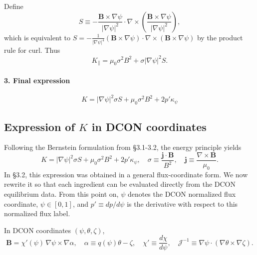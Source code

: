 \documentclass[10pt,a4paper]{article}
\numberwithin{equation}{section}
\begin{document}
Define
\begin{equation}
S \equiv -\frac{\mathbf B\times\nabla\psi}{|\nabla\psi|^2}\cdot\nabla\times\left(\frac{\mathbf B\times\nabla\psi}{|\nabla\psi|^2}\right),
\end{equation}
which is equivalent to $S = -\frac{1}{|\nabla\psi|^4}(\mathbf B\times\nabla\psi)\cdot\nabla\times(\mathbf B\times\nabla\psi)$ by the product rule for curl.
Thus
\begin{equation}
\boxed{K_{\parallel} = \mu_0\sigma^2B^2 + \sigma|\nabla\psi|^2 S}.
\end{equation}

\paragraph{3. Final expression}
\begin{equation}
\boxed{
K = |\nabla\psi|^2 \sigma S + \mu_0\sigma^2B^2 + 2p'\kappa_\psi
}
\end{equation}

\subsection{Expression of $K$ in DCON coordinates}

Following the Bernstein formulation from §3.1-3.2, the energy principle yields
\color{blue}
\begin{equation}
K = |\nabla\psi|^2 \sigma S + \mu_0 \sigma^2 B^2 + 2p'\kappa_\psi, \quad
\sigma \equiv \frac{\mathbf j\cdot\mathbf B}{B^2}, \quad
\mathbf j \equiv \frac{\nabla\times\mathbf B}{\mu_0}.
\end{equation}
\color{black}
In §3.2, this expression was obtained in a general flux-coordinate form.  We now rewrite
it so that each ingredient can be evaluated directly from the DCON equilibrium data.  From
this point on, $\psi$ denotes the DCON normalized flux coordinate, $\psi\in[0,1]$, and
$p' \equiv dp/d\psi$ is the derivative with respect to this normalized flux label.

In DCON coordinates $(\psi,\theta,\zeta)$,
\begin{equation}
\mathbf B = \chi'(\psi)\,\nabla\psi\times\nabla\alpha, \quad
\alpha \equiv q(\psi)\theta-\zeta, \quad
\chi' \equiv \frac{d\chi}{d\psi}, \quad
\mathcal J^{-1} \equiv \nabla\psi\cdot(\nabla\theta\times\nabla\zeta).
\end{equation}
\end{document}
